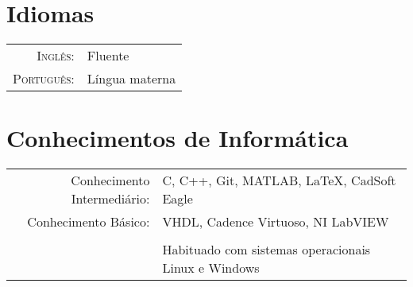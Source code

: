 \documentclass[a4paper,10pt]{article} %
\begin{document}

\section{Idiomas}

\begin{tabular}{rl}
\textsc{Inglês:} & Fluente \\
\textsc{Português:} & Língua materna\\
\end{tabular}


\section{Conhecimentos de Informática}

\begin{tabular}{rl}
Conhecimento Intermediário: & C, C++, Git, MATLAB, LaTeX, CadSoft Eagle  \\
Conhecimento Básico: & VHDL, Cadence Virtuoso, NI LabVIEW\\
&\\
& Habituado com sistemas operacionais Linux e Windows\\
\end{tabular}
\end{document}
